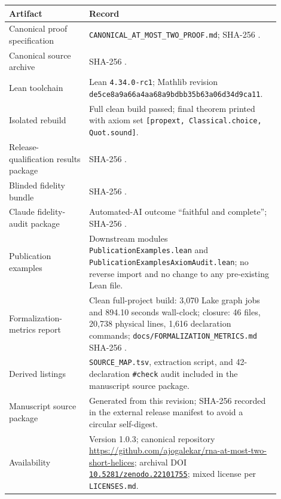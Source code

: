 \documentclass[11pt]{article}
\newcommand{\hashtext}[1]{\texttt{\seqsplit{#1}}}
\newcommand{\RepositoryURL}{\url{https://github.com/ajogalekar/rna-at-most-two-short-helices}}
\newcommand{\ArchiveDOI}{\href{https://doi.org/10.5281/zenodo.22101755}{\texttt{10.5281/zenodo.22101755}}}
\newcommand{\ReleaseVersion}{1.0.3}
\begin{document}
\begin{longtable}{p{0.29\linewidth}p{0.61\linewidth}}
\toprule
Artifact & Record \\
\midrule
\endhead
Canonical proof specification & \texttt{CANONICAL\_AT\_MOST\_TWO\_PROOF.md}; SHA-256 \hashtext{fb9bee1126791b9ca53b3903c061df27e3856dd20b9c7fc248b7acd4e5326841}. \\
Canonical source archive & SHA-256 \hashtext{b077b6118a6cbfadb6c6fce00af65ed34125ffa431f6ca8b7e2e9de3c268d40f}. \\
Lean toolchain & Lean \texttt{4.34.0-rc1}; Mathlib revision \texttt{de5ce8a9a66a4aa68a9bdbb35b63a06d34d9ca11}. \\
Isolated rebuild & Full clean build passed; final theorem printed with axiom set \texttt{[propext, Classical.choice, Quot.sound]}. \\
Release-qualification results package & SHA-256 \hashtext{2da05881fb3808e7add46526f6f202f81e6f0b4f9b37acd622a8acd7b435615b}. \\
Blinded fidelity bundle & SHA-256 \hashtext{bfd2c8d90f5666ccb2dda6a3e9c2f81b84419ae84cc25beb3f880c80b5c66b8b}. \\
Claude fidelity-audit package & Automated-AI outcome ``faithful and complete''; SHA-256 \hashtext{0a77ea7e9f9dc0342a14330b93644dc943a0b2c0e89f302b092ca08de404092b}. \\
Publication examples & Downstream modules \texttt{PublicationExamples.lean} and \texttt{PublicationExamplesAxiomAudit.lean}; no reverse import and no change to any pre-existing Lean file. \\
Formalization-metrics report & Clean full-project build: 3,070 Lake graph jobs and 894.10 seconds wall-clock; closure: 46 files, 20,738 physical lines, 1,616 declaration commands; \texttt{docs/FORMALIZATION\_METRICS.md} SHA-256 \hashtext{b97a0465d97c9568211cf959e35569a4f82c766f511ca553fd1dd6ef1e1433f9}. \\
Derived listings & \texttt{SOURCE\_MAP.tsv}, extraction script, and 42-declaration \texttt{\#check} audit included in the manuscript source package. \\
Manuscript source package & Generated from this revision; SHA-256 recorded in the external release manifest to avoid a circular self-digest. \\
Availability & Version \ReleaseVersion; canonical repository \RepositoryURL; archival DOI \ArchiveDOI; mixed license per \texttt{LICENSES.md}. \\
\bottomrule
\end{longtable}
\end{document}
